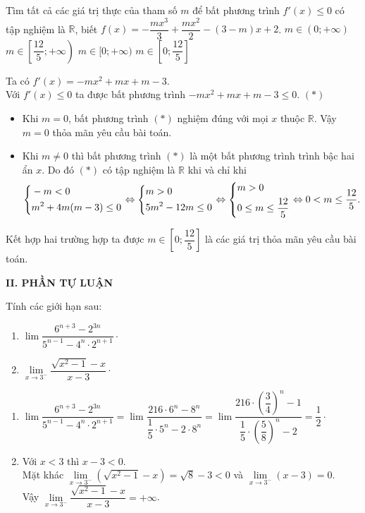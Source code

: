 \begin{ex}%
 Tìm tất cả các giá trị thực của tham số $m$ để bất phương trình $f'(x)\leq 0$ có tập nghiệm là $\mathbb{R}$, biết $f(x) = -\dfrac{mx^3}{3}+\dfrac{mx^2}{2}-(3-m)x+2$.
 \choice
  {$m \in (0;+\infty)$}
  {$m \in \left[\dfrac{12}{5};+\infty\right)$}
  {$m \in [0;+\infty)$}
  {\True $m \in \left[0;\dfrac{12}{5}\right]$}
 \loigiai
  {
  Ta có $f'(x) = -mx^2 + mx + m - 3$.\\
  Với $f'(x) \leq 0$ ta được bất phương trình $-mx^2 + mx + m - 3 \leq 0$. \hfill $(*)$
  \begin{itemize}
   \item Khi $m = 0$, bất phương trình $(*)$ nghiệm đúng với mọi $x$ thuộc $\mathbb{R}$. Vậy $m = 0$ thỏa mãn yêu cầu bài toán.
   \item Khi $m \neq 0$ thì bất phương trình $(*)$ là một bất phương trình trình bậc hai ẩn $x$. Do đó $(*)$ có tập nghiệm là $\mathbb{R}$ khi và chỉ khi
   \begin{align*}
    \left\{\begin{aligned}& -m<0 \\& m^2+4m(m-3)\leq 0\end{aligned}\right.\Leftrightarrow \left\{\begin{aligned}& m>0 \\& 5m^2 - 12m \leq 0\end{aligned}\right. \Leftrightarrow \left\{\begin{aligned}& m>0 \\& 0 \leq m \leq \dfrac{12}{5}\end{aligned}\right. \Leftrightarrow 0<m \leq \dfrac{12}{5}.
   \end{align*}
  \end{itemize}
  Kết hợp hai trường hợp ta được $m \in \left[0;\dfrac{12}{5}\right]$ là các giá trị thỏa mãn yêu cầu bài toán.
  }
\end{ex}



\noindent\textbf{II. PHẦN TỰ LUẬN}

\begin{bt}%
 Tính các giới hạn sau:
 \begin{multicols}{2}
  \begin{enumerate}
   \item $\lim \dfrac{6^{n+3}-2^{3n}}{5^{n-1}-4^n\cdot 2^{n+1}} \cdot$
   \item $\lim\limits_{x\to 3^-}\dfrac{\sqrt{x^2-1}-x}{x-3} \cdot$
  \end{enumerate}
 \end{multicols}
 \loigiai
 {
 \begin{enumerate}
  \item $\lim \dfrac{6^{n+3}-2^{3n}}{5^{n-1}-4^n\cdot 2^{n+1}} = \lim \dfrac{216 \cdot 6^n - 8^n}{\dfrac{1}{5}\cdot 5^n - 2 \cdot 8^n} = \lim \dfrac{216\cdot \left( \dfrac{3}{4} \right)^n - 1}{\dfrac{1}{5}\cdot \left(\dfrac{5}{8}\right)^n - 2} = \dfrac{1}{2} \cdot$
  \item Với $x < 3$ thì $x - 3 < 0$.\\
  Mặt khác $\lim\limits_{x \to 3^-} \left( \sqrt{x^2 - 1} - x \right) = \sqrt{8} - 3 < 0$ và $\lim\limits_{x \to 3^-}(x - 3) = 0$.\\
  Vậy $\lim\limits_{x\to 3^-}\dfrac{\sqrt{x^2-1}-x}{x-3} = +\infty$.
 \end{enumerate}
 }
\end{bt}



